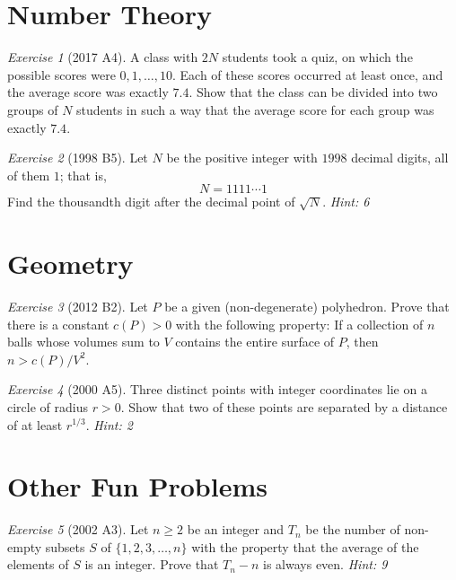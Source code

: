 \documentclass{article}
\theoremstyle{definition}
\theoremstyle{remark}
\newtheorem{exercise}{Exercise}
\begin{document}
\section{Number Theory}

\begin{exercise}[2017 A4]
A class with $2N$ students took a quiz, on which the possible scores were $0, 1,\dots , 10$. Each of these scores occurred at least once, and the average score was exactly $7.4$. Show that the class can be divided into two groups of $N$ students in such a way that the average score for each group was exactly $7.4$. 
\end{exercise}

\begin{exercise}[1998 B5]
Let $N$ be the positive integer with $1998$ decimal digits, all of them $1$; that is, \[N=1111\cdots 1\] Find the thousandth digit after the decimal point of $\sqrt{N}$. \emph{Hint: 6}
\end{exercise}

\section{Geometry}

\begin{exercise}[2012 B2]
Let $P$ be a given (non-degenerate) polyhedron. Prove that there is a constant $c(P ) > 0$ with the following property: If a collection of $n$ balls whose volumes sum to $V$ contains the entire surface of $P$, then $n > c(P)/V^2$.
\end{exercise}

\begin{exercise}[2000 A5]
Three distinct points with integer coordinates lie on a circle of radius $r>0$. Show that two of these points are separated by a distance of at least $r^{1/3}$. \emph{Hint: 2} 
\end{exercise}

\section{Other Fun Problems}

\begin{exercise}[2002 A3]
Let $n\geqslant 2$ be an integer and $T_n$ be the number of non-empty subsets $S$ of $\{1, 2, 3, \dots, n\}$ with the property that the average of the elements of $S$ is an integer. Prove that $T_n - n$ is always even. \emph{Hint: 9}
\end{exercise}
\end{document}
